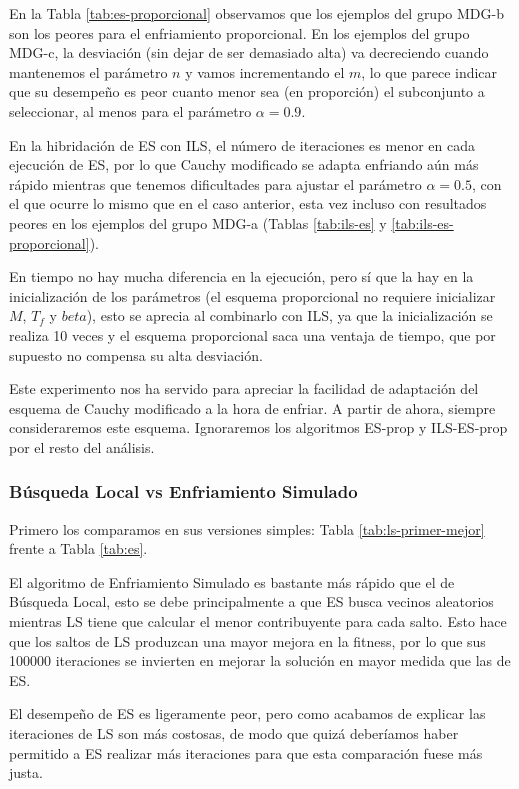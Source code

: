 \documentclass{article}
\begin{document}
En la Tabla \ref{tab:es-proporcional} observamos que los ejemplos del grupo MDG-b son los peores para el enfriamiento
proporcional. En los ejemplos del grupo MDG-c, la desviación (sin dejar de ser demasiado alta) va decreciendo cuando
mantenemos el parámetro $n$ y vamos incrementando el $m$, lo que parece indicar que su desempeño es peor cuanto menor sea
(en proporción) el subconjunto a seleccionar, al menos para el parámetro $\alpha=0.9$.

En la hibridación de ES con ILS, el número de iteraciones es menor en cada ejecución de ES, por lo que Cauchy modificado
se adapta enfriando aún más rápido mientras que tenemos dificultades para ajustar el parámetro $\alpha=0.5$, con el que ocurre
lo mismo que en el caso anterior, esta vez incluso con resultados peores en los ejemplos del grupo MDG-a (Tablas \ref{tab:ils-es} y \ref{tab:ils-es-proporcional}).

En tiempo no hay mucha diferencia en la ejecución, pero sí que la hay en la inicialización de los parámetros (el esquema
proporcional no requiere inicializar $M$, $T_f$ y $beta$), esto se aprecia al combinarlo con ILS, ya que la inicialización
se realiza 10 veces y el esquema proporcional saca una ventaja de tiempo, que por supuesto no compensa su alta desviación.

Este experimento nos ha servido para apreciar la facilidad de adaptación del esquema de Cauchy modificado a la hora de enfriar.
A partir de ahora, siempre consideraremos este esquema. Ignoraremos los algoritmos ES-prop y ILS-ES-prop por el resto del
análisis.

\subsubsection*{Búsqueda Local vs Enfriamiento Simulado}

Primero los comparamos en sus versiones simples: Tabla \ref{tab:ls-primer-mejor} frente a Tabla \ref{tab:es}.

El algoritmo de Enfriamiento Simulado es bastante más rápido que el de Búsqueda Local, esto se debe principalmente a que ES
busca vecinos aleatorios mientras LS tiene que calcular el menor contribuyente para cada salto. Esto hace que los saltos de
LS produzcan una mayor mejora en la fitness, por lo que sus 100000 iteraciones se invierten en mejorar la solución en mayor
medida que las de ES.

El desempeño de ES es ligeramente peor, pero como acabamos de explicar las iteraciones de LS son más costosas, de modo
que quizá deberíamos haber permitido a ES realizar más iteraciones para que esta comparación fuese más justa.
\end{document}

